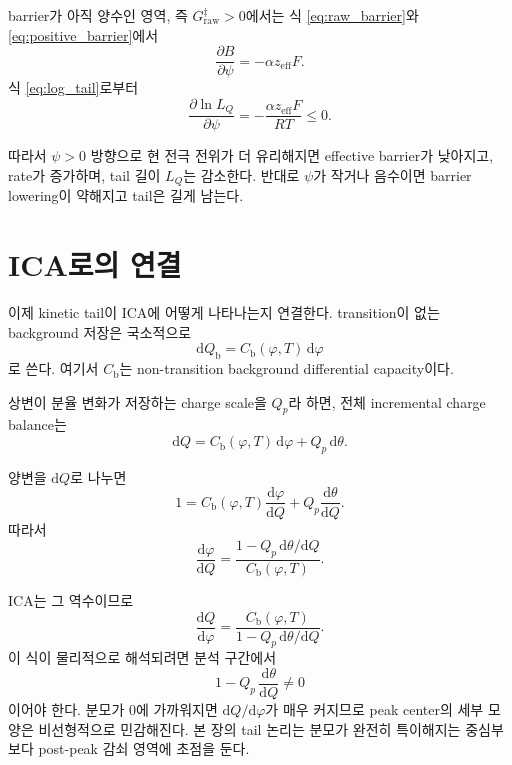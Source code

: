 \documentclass[11pt]{article}
\newcommand{\dd}{\mathrm{d}}
\newcommand{\raw}{\mathrm{raw}}
\begin{document}
barrier가 아직 양수인 영역, 즉 \(G_{\raw}^\ddagger>0\)에서는 식 \eqref{eq:raw_barrier}와 \eqref{eq:positive_barrier}에서
\begin{equation}
\frac{\partial B}{\partial\psi}
=
-
\alpha z_{\mathrm{eff}}F .
\end{equation}
식 \eqref{eq:log_tail}로부터
\begin{equation}
\boxed{
\frac{\partial\ln L_Q}{\partial\psi}
=
-
\frac{\alpha z_{\mathrm{eff}}F}{RT}
\le0 .
}
\label{eq:potential_tail_derivative}
\end{equation}

따라서 \(\psi>0\) 방향으로 현 전극 전위가 더 유리해지면 effective barrier가 낮아지고, rate가 증가하며, tail 길이 \(L_Q\)는 감소한다. 반대로 \(\psi\)가 작거나 음수이면 barrier lowering이 약해지고 tail은 길게 남는다.

\section{ICA로의 연결}

이제 kinetic tail이 ICA에 어떻게 나타나는지 연결한다. transition이 없는 background 저장은 국소적으로
\begin{equation}
\dd Q_{\mathrm b}
=
C_{\mathrm b}(\varphi,T)\,\dd\varphi
\end{equation}
로 쓴다. 여기서 \(C_{\mathrm b}\)는 non-transition background differential capacity이다.

상변이 분율 변화가 저장하는 charge scale을 \(Q_p\)라 하면, 전체 incremental charge balance는
\begin{equation}
\boxed{
\dd Q
=
C_{\mathrm b}(\varphi,T)\,\dd\varphi
+
Q_p\,\dd\theta .
}
\label{eq:incremental_storage}
\end{equation}

양변을 \(\dd Q\)로 나누면
\begin{equation}
1
=
C_{\mathrm b}(\varphi,T)\frac{\dd\varphi}{\dd Q}
+
Q_p\frac{\dd\theta}{\dd Q}.
\end{equation}
따라서
\begin{equation}
\frac{\dd\varphi}{\dd Q}
=
\frac{
1-Q_p\,\dd\theta/\dd Q
}{
C_{\mathrm b}(\varphi,T)
}.
\label{eq:dphidQ}
\end{equation}

ICA는 그 역수이므로
\begin{equation}
\boxed{
\frac{\dd Q}{\dd\varphi}
=
\frac{
C_{\mathrm b}(\varphi,T)
}{
1-Q_p\,\dd\theta/\dd Q
}.
}
\label{eq:ica_mapping}
\end{equation}
이 식이 물리적으로 해석되려면 분석 구간에서
\begin{equation}
1-Q_p\,\frac{\dd\theta}{\dd Q}\ne0
\end{equation}
이어야 한다. 분모가 0에 가까워지면 \(\dd Q/\dd\varphi\)가 매우 커지므로 peak center의 세부 모양은 비선형적으로 민감해진다. 본 장의 tail 논리는 분모가 완전히 특이해지는 중심부보다 post-peak 감쇠 영역에 초점을 둔다.
\end{document}
